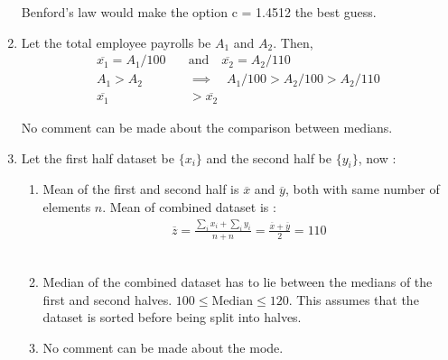 \begin{enumerate}
	Benford's law would make the option c = 1.4512 the best guess. \\
	
	\item Let the total employee payrolls be $ A_1 $ and $ A_2 $. Then, 
	\begin{subequations}
		\begin{align}
			\overline{x_1} = A_1 / 100 \quad &\text{and} \quad \overline{x_2} = A_2 / 110 \\
			A_1 > A_2 \quad &\implies \quad A_1 / 100 > A_2 / 100 > A_2 / 110 \\
			\overline{x_1} &> \overline{x_2} 
		\end{align}
	\end{subequations}
	
	No comment can be made about the comparison between medians. \\
	
	\item Let the first half dataset be $ \{x_i\} $ and the second half be $ \{y_i\} $, now : 
	\begin{enumerate}
		\item Mean of the first and second half is $\overline{x}$ and $ \overline{y} $, both with same number of elements $ n $. Mean of combined dataset is : 
		\begin{align}
			\overline{z} = \frac{\sum_{i} x_i + \sum_{i} y_i}{n + n} = \frac{\overline{x} + \overline{y}}{2} = 110
		\end{align} \\
		
		\item Median of the combined dataset has to lie between the medians of the first and second halves. $ 100 \leq \text{Median}  \leq 120 $. This assumes that the dataset is sorted before being split into halves. \\
		
		\item No comment can be made about the mode.
	\end{enumerate}
	

\end{enumerate}
